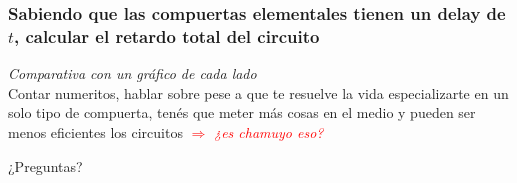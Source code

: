 \documentclass[mathserif,hyperref]{beamer}
\begin{document}
\begin{frame}
\frametitle{\small Sabiendo que las compuertas elementales tienen un delay
de $t$, calcular el retardo total del circuito}
\textit{Comparativa con un gráfico de cada lado}
\\ Contar numeritos, hablar sobre pese a que te resuelve la vida
especializarte en un solo tipo de compuerta, tenés que meter más cosas en el
medio y pueden ser menos eficientes los circuitos
\textcolor{red}{$\Rightarrow$ \textit{¿es chamuyo eso?}}
\end{frame}


\begin{frame}
¿Preguntas?
\end{frame}
\end{document}
